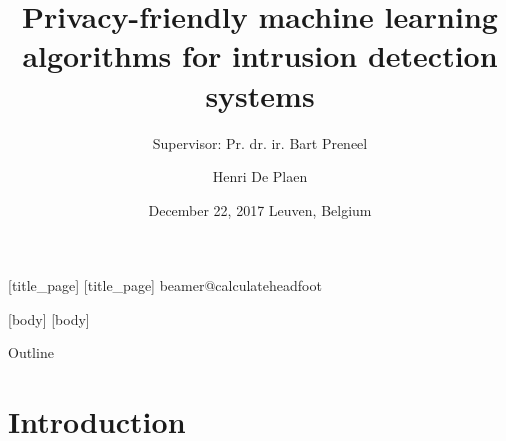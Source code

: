 \documentclass[11pt,t]{beamer}
\title{Privacy-friendly machine learning algorithms for intrusion detection systems}
\author{Henri De Plaen}
\institute{Master Applied Mathematics, KU Leuven}
\subtitle{Supervisor: Pr. dr. ir. Bart Preneel}
\date{December 22, 2017 Leuven, Belgium}
\begin{document}
	[title_page]
	[title_page]
	\csname beamer@calculateheadfoot\endcsname %
		\begin{frame}
			\titlepage
		\end{frame}
	[body]
	[body]

\begin{frame}{Outline}
	\vskip 5mm
	\hfill	{\large \parbox{1\textwidth}{\tableofcontents[hideallsubsections]}}
\end{frame}

\section{Introduction}
\end{document}
